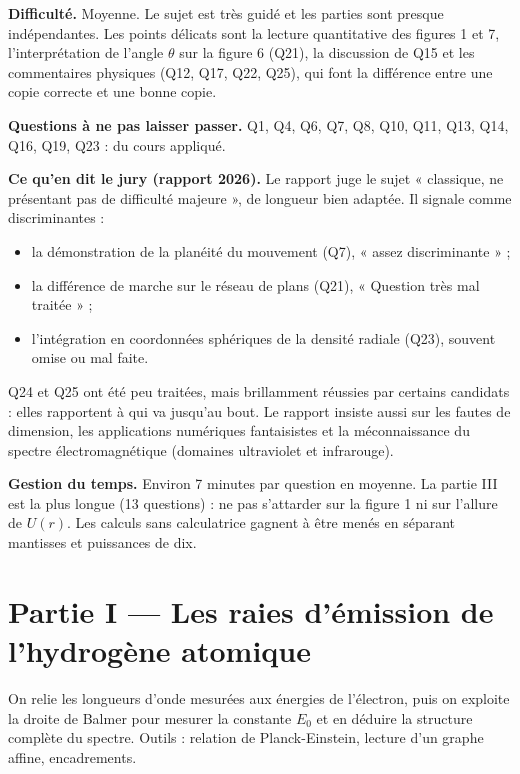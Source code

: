 \documentclass[11pt,a4paper]{article}
\providecommand{\tightlist}{\setlength{\itemsep}{0pt}\setlength{\parskip}{0pt}}
\begin{document}
\textbf{Difficulté.} Moyenne. Le sujet est très guidé et les parties sont presque indépendantes. Les points délicats sont la lecture quantitative des figures 1 et 7, l'interprétation de l'angle \(\theta\) sur la figure 6 (Q21), la discussion de Q15 et les commentaires physiques (Q12, Q17, Q22, Q25), qui font la différence entre une copie correcte et une bonne copie.

\textbf{Questions à ne pas laisser passer.} Q1, Q4, Q6, Q7, Q8, Q10, Q11, Q13, Q14, Q16, Q19, Q23 : du cours appliqué.

\textbf{Ce qu'en dit le jury (rapport 2026).} Le rapport juge le sujet « classique, ne présentant pas de difficulté majeure », de longueur bien adaptée. Il signale comme discriminantes :

\begin{itemize}
\tightlist
\item
  la démonstration de la planéité du mouvement (Q7), « assez discriminante » ;
\item
  la différence de marche sur le réseau de plans (Q21), « Question très mal traitée » ;
\item
  l'intégration en coordonnées sphériques de la densité radiale (Q23), souvent omise ou mal faite.
\end{itemize}

Q24 et Q25 ont été peu traitées, mais brillamment réussies par certains candidats : elles rapportent à qui va jusqu'au bout. Le rapport insiste aussi sur les fautes de dimension, les applications numériques fantaisistes et la méconnaissance du spectre électromagnétique (domaines ultraviolet et infrarouge).

\textbf{Gestion du temps.} Environ 7 minutes par question en moyenne. La partie III est la plus longue (13 questions) : ne pas s'attarder sur la figure 1 ni sur l'allure de \(U(r)\). Les calculs sans calculatrice gagnent à être menés en séparant mantisses et puissances de dix.

\hypertarget{partie-i-les-raies-duxe9mission-de-lhydroguxe8ne-atomique}{%
\section{Partie I --- Les raies d'émission de l'hydrogène atomique}\label{partie-i-les-raies-duxe9mission-de-lhydroguxe8ne-atomique}}

On relie les longueurs d'onde mesurées aux énergies de l'électron, puis on exploite la droite de Balmer pour mesurer la constante \(E_0\) et en déduire la structure complète du spectre. Outils : relation de Planck-Einstein, lecture d'un graphe affine, encadrements.
\end{document}
